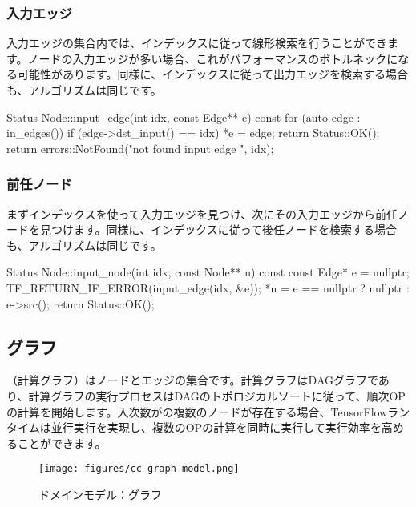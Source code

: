 \begin{content}
\subsubsection{入力エッジ}

入力エッジの集合内では、インデックスに従って線形検索を行うことができます。ノードの入力エッジが多い場合、これがパフォーマンスのボトルネックになる可能性があります。同様に、インデックスに従って出力エッジを検索する場合も、アルゴリズムは同じです。

\begin{leftbar}
\begin{c++}
Status Node::input_edge(int idx, const Edge** e) const {
  for (auto edge : in_edges()) {
    if (edge->dst_input() == idx) {
      *e = edge;
      return Status::OK();
    }
  }
  return errors::NotFound("not found input edge ", idx);
}
\end{c++}
\end{leftbar}

\subsubsection{前任ノード}

まずインデックスを使って入力エッジを見つけ、次にその入力エッジから前任ノードを見つけます。同様に、インデックスに従って後任ノードを検索する場合も、アルゴリズムは同じです。

\begin{leftbar}
\begin{c++}
Status Node::input_node(int idx, const Node** n) const {
  const Edge* e = nullptr;
  TF_RETURN_IF_ERROR(input_edge(idx, &e));
  *n = e == nullptr ? nullptr : e->src();
  return Status::OK();
}
\end{c++}
\end{leftbar}

\subsection{グラフ}

（計算グラフ）はノードとエッジの集合です。計算グラフはDAGグラフであり、計算グラフの実行プロセスはDAGのトポロジカルソートに従って、順次OPの計算を開始します。入次数がの複数のノードが存在する場合、TensorFlowランタイムは並行実行を実現し、複数のOPの計算を同時に実行して実行効率を高めることができます。

\begin{figure}[H]
\centering
\texttt{[image: figures/cc-graph-model.png]}
\caption{ドメインモデル：グラフ}
 \label{fig:cc-graph-model}
\end{figure}


\end{content}
